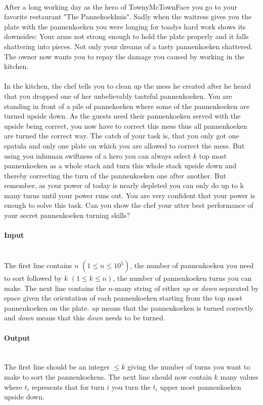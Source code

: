 



\makeheader \ \\
After a long working day as the hero of TownyMcTownFace you go to your favorite restaurant "The Pannekoekhuis". Sadly when the waitress gives you the plate with the pannenkoeken you were longing for toadys hard work shows its downsides: Your arms not strong enough to hold the plate properly and it falls shattering into pieces. Not only your dreams of a tasty pannenkoeken shattered. The owner now wants you to repay the damage you caused by working in the kitchen. \\ \ \\
In the kitchen, the chef tells you to clean up the mess he created after he heard that you dropped one of her unbelievably tasteful pannenkoeken. You are standing in front of a pile of pannekoeken where some of the pannenkoeken are turned upside down. As the guests need their pannenkoeken served with the upside being correct, you now have to correct this mess thus all pannenkoeken are turned the correct way. The catch of your task is, that you only got one spatula and only one plate on which you are allowed to correct the mess. But using you inhuman swiftness of a hero you can always select $k$ top most pannenkoeken as a whole stack and turn this whole stack upside down and thereby correcting the turn of the pannenkoeken one after another. But remember, as your power of today is nearly depleted you can only do up to k many turns until your power runs out. You are very confident that your power is enough to solve this task. Can you show the chef your utter best performance of your secret pannenkoeken turning skills?


\paragraph*{Input}\ \\
The first line contains $n$ $(1 \leq n \leq  10^5)$, the number of pannenkoeken you need to sort followed by $k$ $(1 \leq k \leq  n)$, the number of pannenkoeken turns you can make. The next line contains the $n$-many string of either \emph{up} or \emph{down} separated by space given the orientation of each pannenkoeken starting from the top most pannenkoeken on the plate. \emph{up} means that the pannenkoeken is turned correctly and \emph{down} means that this \emph{down} needs to be turned.

\paragraph*{Output}\ \\
The first line should be an integer $\leq k$ giving the number of turns you want to make to sort the pannenkoekens. The next line should now contain $k$ many values where $t_i$ represents that for turn $i$ you turn the $t_i$ upper most pannenkoeken upside down.
\begin{samples}
\end{samples}

